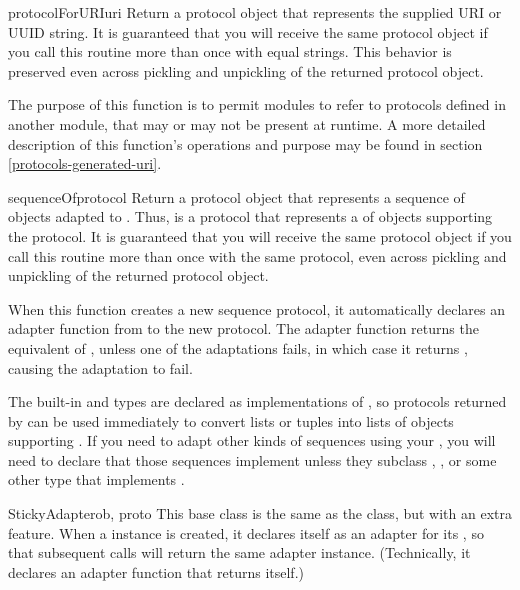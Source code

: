 \begin{verbatim%
}
\begin{verbatim%
}
\begin{verbatim%
}
\begin{verbatim%
}
\begin{verbatim%
}
\begin{verbatim%
}
\begin{funcdesc}{protocolForURI}{uri} 
Return a protocol object that represents the supplied URI or UUID string.  It
is guaranteed that you will receive the same protocol object if you call this
routine more than once with equal strings.  This behavior is preserved even
across pickling and unpickling of the returned protocol object.

The purpose of this function is to permit modules to refer to protocols defined
in another module, that may or may not be present at runtime.  A more detailed
description of this function's operations and purpose may be found in
section \ref{protocols-generated-uri}.
\end{funcdesc}

\begin{funcdesc}{sequenceOf}{protocol} 
Return a protocol object that represents a sequence of objects adapted to
.  Thus,  is a protocol that
represents a  of objects supporting the
 protocol.  It is guaranteed that you will receive the same protocol
object if you call this routine more than once with the same protocol, even
across pickling and unpickling of the returned protocol object.

When this function creates a new sequence protocol, it automatically declares
an adapter function from  to the new protocol.
The adapter function returns the equivalent of , unless one of the adaptations fails, in which case it returns
, causing the adaptation to fail.

The built-in  and  types are declared as
implementations of , so protocols returned by
 can be used immediately to convert lists or tuples into
lists of objects supporting .  If you need to adapt other kinds
of sequences using your , you will need to declare
that those sequences implement  unless they
subclass , , or some other type that implements
.
\end{funcdesc}






\begin{classdesc}{StickyAdapter}{ob, proto}
This base class is the same as the  class, but with an extra
feature.  When a  instance is created, it declares itself
as an adapter for its , so that subsequent 
calls will return the same adapter instance.  (Technically, it declares an
adapter function that returns itself.)


\end{classdesc}
\end{verbatim%
}
\end{verbatim%
}
\end{verbatim%
}
\end{verbatim%
}
\end{verbatim%
}
\end{verbatim%
}
